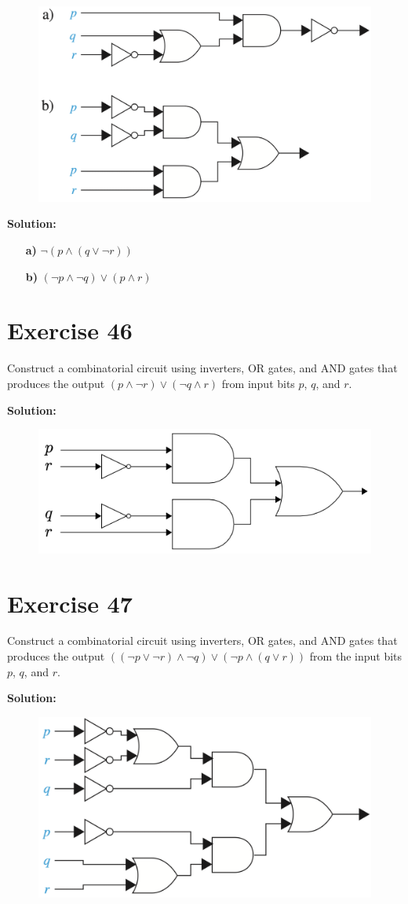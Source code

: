 \documentclass{Axon}
\begin{document}
\begin{figure}[h]
\centering
\includegraphics[width=0.5\linewidth]{Discrete Mathematics and its Applications, 8th Edition/Chapter 1 Logic and Proofs/Section 1.2 Applications of Propositional Logic/Exercise 45.png}
\end{figure}

\noindent
\textbf{Solution:}
\begin{enumerate}
    \item[\textbf{a)}] \(\lnot (p \land (q \lor \lnot r))\)
    \item[\textbf{b)}] \((\lnot p \land \lnot q) \lor (p \land r)\)
\end{enumerate}

\section*{Exercise 46}
Construct a combinatorial circuit using inverters, OR gates, and AND gates that produces the output \((p \land \lnot r) \lor (\lnot q \land r)\) from input bits \(p\), \(q\), and \(r\).

\noindent
\textbf{Solution:}
\begin{figure}[ht]
\centering
\includegraphics[width=0.5\linewidth]{Discrete Mathematics and its Applications, 8th Edition/Chapter 1 Logic and Proofs/Section 1.2 Applications of Propositional Logic/Exercise 46.png}
\end{figure}

\section*{Exercise 47}
Construct a combinatorial circuit using inverters, OR gates, and AND gates that produces the output \(((\lnot p \lor \lnot r) \land \lnot q) \lor (\lnot p \land (q \lor r))\) from the input bits \(p\), \(q\), and \(r\).

\noindent
\textbf{Solution:}
\begin{figure}[ht]
\centering
\includegraphics[width=0.5\linewidth]{Discrete Mathematics and its Applications, 8th Edition/Chapter 1 Logic and Proofs/Section 1.2 Applications of Propositional Logic/Exercise 47.png}
\end{figure}

\printbibliography
\end{document}
